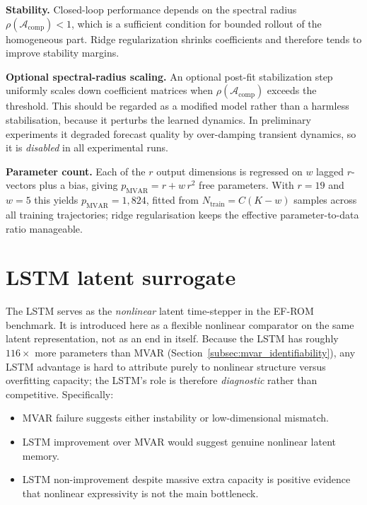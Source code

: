 \noindent\textbf{Stability.}
Closed-loop performance depends on the spectral radius
$\rho(\mathcal{A}_{\mathrm{comp}}) < 1$,
which is a sufficient condition for bounded rollout of the homogeneous part.
Ridge regularization shrinks coefficients and therefore tends to improve
stability margins.

\noindent\textbf{Optional spectral-radius scaling.}
An optional post-fit stabilization step
uniformly scales down coefficient matrices when
$\rho(\mathcal{A}_{\mathrm{comp}})$ exceeds the threshold.
This should be regarded as a modified model rather than a harmless
stabilisation, because it perturbs the learned dynamics.
In preliminary experiments it degraded forecast quality by over-damping
transient dynamics, so it is \emph{disabled} in all experimental runs.

\noindent\textbf{Parameter count.}\label{subsec:mvar_identifiability}
Each of the $r$ output dimensions is regressed on $w$ lagged $r$-vectors
plus a bias, giving $p_{\mathrm{MVAR}} = r + w\,r^2$ free parameters.
With $r{=}19$ and $w{=}5$ this yields $p_{\mathrm{MVAR}} = 1{,}824$,
fitted from $N_{\mathrm{train}} = C(K{-}w)$ samples across all training
trajectories; ridge regularisation keeps the effective parameter-to-data
ratio manageable.

\section{LSTM latent surrogate}
\label{sec:lstm_surrogate}

The LSTM serves as the \emph{nonlinear} latent time-stepper in the EF-ROM
benchmark.
It is introduced here as a flexible nonlinear comparator on the same latent
representation, not as an end in itself.
Because the LSTM has roughly $116\times$ more parameters than MVAR
(Section~\ref{subsec:mvar_identifiability}), any LSTM advantage is hard to
attribute purely to nonlinear structure versus overfitting capacity; the
LSTM's role is therefore \emph{diagnostic} rather than competitive.
Specifically:
\begin{itemize}[nosep]
  \item MVAR failure suggests either instability or low-dimensional mismatch.
  \item LSTM improvement over MVAR would suggest genuine nonlinear latent memory.
  \item LSTM non-improvement despite massive extra capacity is positive evidence
        that nonlinear expressivity is not the main bottleneck.
\end{itemize}

